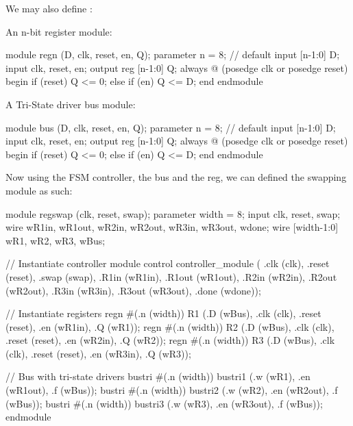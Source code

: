 \documentclass[12pt,openany]{book}
\begin{document}
\begin{minipage}[htp]{1\textwidth}
	We may also define :\newline
	\begin{minipage}[htp]{0.45\textwidth}
		An n-bit register module:
		\begin{vhdl}
	module regn (D, clk, reset, en, Q);
		parameter n = 8; // default
		input [n-1:0] D;
		input clk, reset, en;
		output reg [n-1:0] Q;
		always @ (posedge clk or posedge reset) begin
		if (reset) Q <= 0;
		else if (en) Q <= D;
		end
	endmodule
		\end{vhdl}
	\end{minipage}
	\hfill
	\vline
	\hfill
	\begin{minipage}[htp]{0.45\textwidth}
		A Tri-State driver bus module:
		\begin{vhdl}
	module bus (D, clk, reset, en, Q);
		parameter n = 8; // default
		input [n-1:0] D;
		input clk, reset, en;
		output reg [n-1:0] Q;
		always @ (posedge clk or posedge reset) begin
			if (reset) Q <= 0;
			else if (en) Q <= D;
		end
	endmodule
		\end{vhdl}
	\end{minipage}
\end{minipage}
\newline
\vfill

\begin{minipage}[htp]{1\textwidth}
	Now using the FSM controller, the bus and the reg, we can defined the swapping module as such:
	\begin{vhdl}
	module regswap (clk, reset, swap);
		parameter width = 8;
		input clk, reset, swap;
		wire wR1in, wR1out, wR2in, wR2out, wR3in, wR3out, wdone;
		wire [width-1:0] wR1, wR2, wR3, wBus;
	
		// Instantiate controller module
		control controller_module ( .clk (clk), .reset (reset), .swap (swap),
		.R1in (wR1in), .R1out (wR1out), .R2in (wR2in), .R2out (wR2out),
		.R3in (wR3in), .R3out (wR3out), .done (wdone));
	
		// Instantiate registers
		regn #(.n (width)) R1 (.D (wBus), .clk (clk), .reset (reset), .en (wR1in), .Q (wR1));
		regn #(.n (width)) R2 (.D (wBus), .clk (clk), .reset (reset), .en (wR2in), .Q (wR2));
		regn #(.n (width)) R3 (.D (wBus), .clk (clk), .reset (reset), .en (wR3in), .Q (wR3));
	
		// Bus with tri-state drivers
		bustri #(.n (width)) bustri1 (.w (wR1), .en (wR1out), .f (wBus));
		bustri #(.n (width)) bustri2 (.w (wR2), .en (wR2out), .f (wBus));
		bustri #(.n (width)) bustri3 (.w (wR3), .en (wR3out), .f (wBus));
	endmodule
	\end{vhdl}
\end{minipage}
\end{document}
